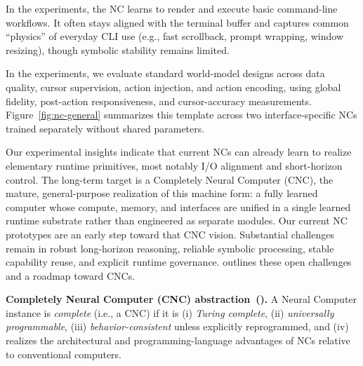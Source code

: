 In the \nccligen{} experiments, the NC learns to render and execute basic command-line workflows.
It often stays aligned with the terminal buffer and captures common ``physics'' of everyday CLI use (e.g., fast scrollback, prompt wrapping, window resizing), though symbolic stability remains limited.

In the \ncguiworld{} experiments, we evaluate standard world-model designs across data quality, cursor supervision, action injection, and action encoding, using global fidelity, post-action responsiveness, and cursor-accuracy measurements.
Figure~\ref{fig:nc-general} summarizes this template across two interface-specific NCs trained separately without shared parameters. 

Our experimental insights indicate that current NCs can already learn to realize elementary runtime primitives, most notably I/O alignment and short-horizon control.
The long-term target is a Completely Neural Computer (CNC), the mature, general-purpose realization of this machine form: a fully learned computer whose compute, memory, and interfaces are unified in a single learned runtime substrate rather than engineered as separate modules.
Our current NC prototypes are an early step toward that CNC vision. 
Substantial challenges remain in robust long-horizon reasoning, reliable symbolic processing, stable capability reuse, and explicit runtime governance.
 outlines these open challenges and a roadmap toward CNCs. 

\begin{tcolorbox}[
  colback=apricotglaze!40!white,
  colframe=metablue!40,
  interior style={shade,shading angle=315,left color=white,right color=apricotglaze!55!white},
  boxrule=0pt,
  borderline west={1pt}{0pt}{gray!60},
  left=6pt,right=4pt,top=3pt,bottom=3pt]
\small
\textbf{Completely Neural Computer (CNC) abstraction~().}
A Neural Computer instance is \emph{complete} (i.e., a CNC) if it is
(i) \emph{Turing complete},
(ii) \emph{universally programmable},
(iii) \emph{behavior-consistent} unless explicitly reprogrammed, and
(iv) realizes the architectural and programming-language advantages of NCs relative to conventional computers.
\end{tcolorbox}

